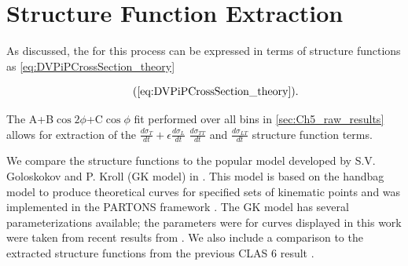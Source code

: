     \clearpage

\section{Structure Function Extraction}

    As discussed, the \xsec for this process can be expressed in terms of structure functions as \ref{eq:DVPiPCrossSection_theory}
    
        \begin{equation*}
             \recallLabel{eq:DVPiPCrossSection_theory}.
        \end{equation*}

    The  A+B$\cos{2\phi}$+C$\cos{\phi}$ fit performed over all bins in \ref{sec:Ch5_raw_results} allows for extraction of the $\frac{d\sigma_T}{dt} + \epsilon \frac{d\sigma_L}{dt}$ $\frac{d\sigma_{TT}}{dt}$  and $\frac{d\sigma_{LT}}{dt}$ structure function terms. 

    We compare the structure functions to the popular model developed by S.V. Goloskokov and P. Kroll (GK model) \parencite{Goloskokov2010AnElectroproduction} in . This model is based on the handbag model to produce theoretical curves for specified sets of kinematic points and was implemented in the PARTONS framework \parencite{Berthou2018PARTONS:Software}. The GK model has several parameterizations available; the parameters were for curves displayed in this work were taken from recent results from \parencite{Diehl2020ExtractionKinematics}. We also include a comparison to the extracted structure functions from the previous CLAS 6 result \parencite{Bedlinskiy2014ExclusiveCLAS}.
    
   


